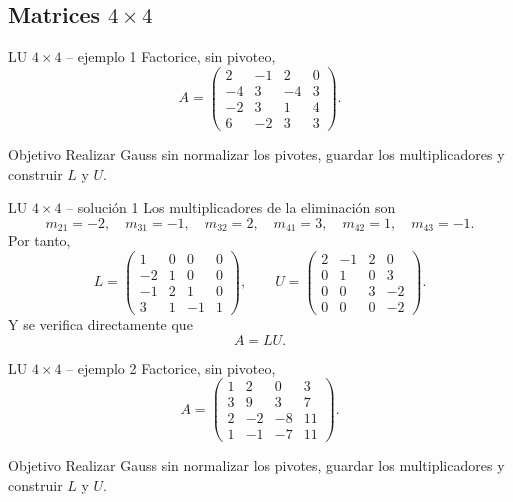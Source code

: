 \documentclass[aspectratio=169,10pt]{beamer}
\begin{document}
\subsection{Matrices $4\times 4$}
\begin{frame}{LU $4\times 4$ -- ejemplo 1}
\small
Factorice, sin pivoteo,
\[
A=\begin{pmatrix}2 & -1 & 2 & 0\\-4 & 3 & -4 & 3\\-2 & 3 & 1 & 4\\6 & -2 & 3 & 3\end{pmatrix}.
\]
\begin{block}{Objetivo}
Realizar Gauss sin normalizar los pivotes, guardar los multiplicadores y construir $L$ y $U$.
\end{block}
\end{frame}
\begin{frame}{LU $4\times 4$ -- solución 1}
\small
Los multiplicadores de la eliminación son
\[
m_{21}=-2,\quad m_{31}=-1,\quad m_{32}=2,\quad m_{41}=3,\quad m_{42}=1,\quad m_{43}=-1.
\]
Por tanto,
\[
L=\begin{pmatrix}1 & 0 & 0 & 0\\-2 & 1 & 0 & 0\\-1 & 2 & 1 & 0\\3 & 1 & -1 & 1\end{pmatrix},\qquad U=\begin{pmatrix}2 & -1 & 2 & 0\\0 & 1 & 0 & 3\\0 & 0 & 3 & -2\\0 & 0 & 0 & -2\end{pmatrix}.
\]
Y se verifica directamente que
\[
\boxed{A=LU}.
\]
\end{frame}
\begin{frame}{LU $4\times 4$ -- ejemplo 2}
\small
Factorice, sin pivoteo,
\[
A=\begin{pmatrix}1 & 2 & 0 & 3\\3 & 9 & 3 & 7\\2 & -2 & -8 & 11\\1 & -1 & -7 & 11\end{pmatrix}.
\]
\begin{block}{Objetivo}
Realizar Gauss sin normalizar los pivotes, guardar los multiplicadores y construir $L$ y $U$.
\end{block}
\end{frame}
\end{document}
